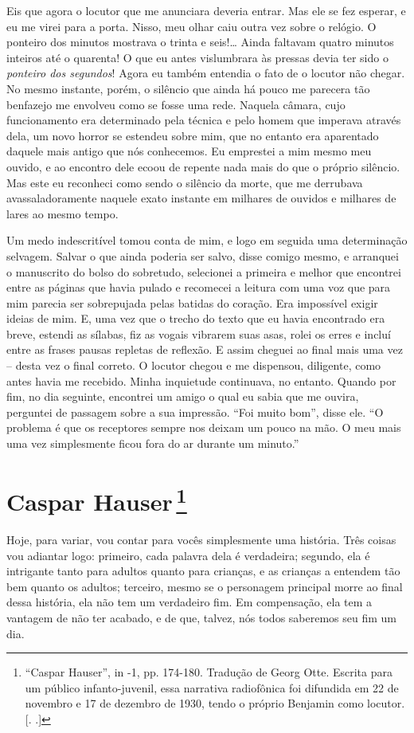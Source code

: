 Eis que agora o locutor que me anunciara deveria entrar. Mas ele se fez
esperar, e eu me virei para a porta. Nisso, meu olhar caiu outra vez
sobre o relógio. O ponteiro dos minutos mostrava o trinta e seis!\ldots{}
Ainda faltavam quatro minutos inteiros até o quarenta! O que eu antes
vislumbrara às pressas devia ter sido o \emph{ponteiro dos segundos}!
Agora eu também entendia o fato de o locutor não chegar. No mesmo
instante, porém, o silêncio que ainda há pouco me parecera tão benfazejo
me envolveu como se fosse uma rede. Naquela câmara, cujo funcionamento
era determinado pela técnica e pelo homem que imperava através dela, um
novo horror se estendeu sobre mim, que no entanto era aparentado daquele
mais antigo que nós conhecemos. Eu emprestei a mim mesmo meu ouvido, e
ao encontro dele ecoou de repente nada mais do que o próprio silêncio.
Mas este eu reconheci como sendo o silêncio da morte, que me derrubava
avassaladoramente naquele exato instante em milhares de ouvidos e
milhares de lares ao mesmo tempo.

Um medo indescritível tomou conta de mim, e logo em seguida uma
determinação selvagem. Salvar o que ainda poderia ser salvo, disse
comigo mesmo, e arranquei o manuscrito do bolso do sobretudo, selecionei
a primeira e melhor que encontrei entre as páginas que havia pulado e
recomecei a leitura com uma voz que para mim parecia ser sobrepujada
pelas batidas do coração. Era impossível exigir ideias de mim. E, uma
vez que o trecho do texto que eu havia encontrado era breve, estendi as
sílabas, fiz as vogais vibrarem suas asas, rolei os erres e incluí entre
as frases pausas repletas de reflexão. E assim cheguei ao final mais uma
vez -- desta vez o final correto. O locutor chegou e me dispensou,
diligente, como antes havia me recebido. Minha inquietude continuava, no
entanto. Quando por fim, no dia seguinte, encontrei um amigo o qual eu
sabia que me ouvira, perguntei de passagem sobre a sua impressão. ``Foi
muito bom'', disse ele. ``O problema é que os receptores sempre nos
deixam um pouco na mão. O meu mais uma vez simplesmente ficou fora do ar
durante um minuto.''

\chapter{Caspar Hauser\,\footnote[*]{``Caspar Hauser'', in  -1,
  pp. 174-180. Tradução de Georg Otte. Escrita para um público
  infanto-juvenil, essa narrativa radiofônica foi difundida em 22 de
  novembro e 17 de dezembro de 1930, tendo o próprio Benjamin como
  locutor. [. .]} }
Hoje, para variar, vou contar para vocês simplesmente uma história. Três
coisas vou adiantar logo: primeiro, cada palavra dela é verdadeira;
segundo, ela é intrigante tanto para adultos quanto para crianças, e as
crianças a entendem tão bem quanto os adultos; terceiro, mesmo se o
personagem principal morre ao final dessa história, ela não tem um
verdadeiro fim. Em compensação, ela tem a vantagem de não ter acabado, e de
que, talvez, nós todos saberemos seu fim um dia.

